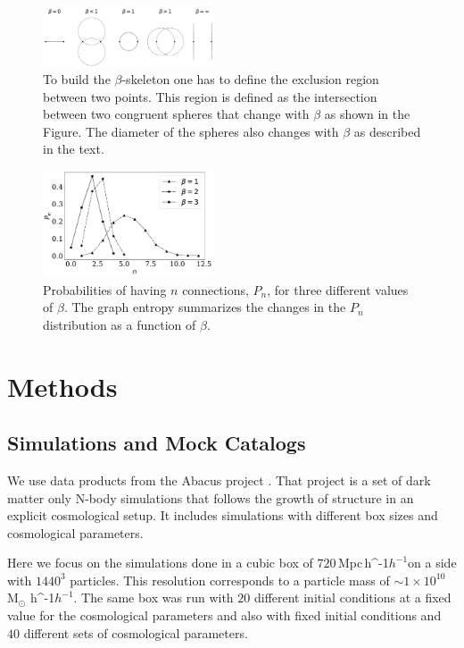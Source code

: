 \documentclass[fleqn,usenatbib]{mnras}
\newcommand{\Msunh}{\,{\rm M}$_{\odot}$\,\,\ifmmode h^{-1}\else $h^{-1}$\fi}
\newcommand{\Mpch}{\,{\rm Mpc}\,\ifmmode h^{-1}\else $h^{-1}$\fi}
\begin{document}
\begin{figure}
    \centering
    \includegraphics[width=0.45\textwidth]{betas.pdf}
   \caption{To build the $\beta$-skeleton one has to define 
     the exclusion region between two points.
     This region is defined as the
     intersection between two congruent spheres that change with
     $\beta$ as shown in the Figure.
     The diameter of the spheres also changes with $\beta$ as
     described in the text.
 \label{fig:example}}  
\end{figure} 


\begin{figure}
    \includegraphics[width=0.45\textwidth]{probabilities.pdf}
    \caption{Probabilities of having $n$ connections, $P_n$, for three different values of
    $\beta$. 
    The graph entropy summarizes the changes in the $P_n$ distribution as a function of $\beta$.}
    \label{fig:probabilities}
\end{figure}


\section{Methods}


\subsection{Simulations and Mock Catalogs}

We use data products from the Abacus project \citep{abacus}.
That project is a set of dark matter only N-body simulations that follows
the growth of structure in an explicit cosmological setup.
It includes simulations with different box sizes and cosmological parameters.

Here we focus on the simulations done in a cubic box of $720$\Mpch on a side
with $1440^3$ particles. 
This resolution corresponds to a particle mass of $\sim1\times10^{10}$ \Msunh.
The same box was run with $20$ different initial conditions at a fixed value for
the cosmological parameters and also with fixed initial conditions and $40$ different
sets of cosmological parameters.
\end{document}
